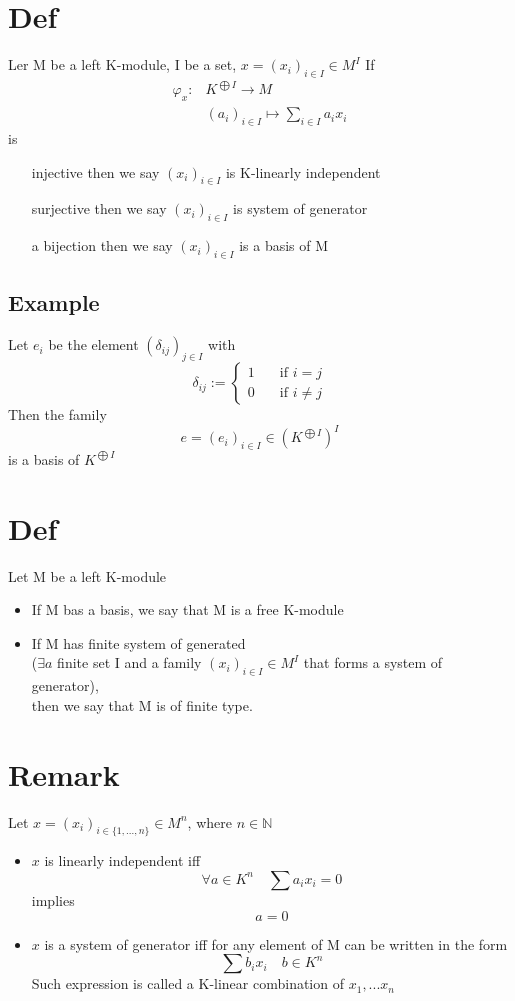 \documentclass{book}
\begin{document}
\section{Def}
Ler M be a left K-module, I be a set, $x=(x_i)_{i\in I}\in M^I$ If $$\begin{aligned}
\varphi_x:&K^{\bigoplus I}\rightarrow M\\ &(a_i)_{i\in I}\mapsto\sum\limits_{i\in I}a_ix_i
\end{aligned}$$ is
\begin{itemize}
    \item [injective] then we say $(x_i)_{i\in I}$ is K-linearly independent
    \item [surjective]then we say $(x_i)_{i\in I}$ is system of generator
    \item [a bijection]then we say $(x_i)_{i\in I}$ is a basis of M
\end{itemize}
\subsection*{Example}
Let $e_i$ be the element $(\delta_{ij})_{j\in I}$ with
$$\delta_{ij}:=\left\{\begin{aligned}
    1\quad &\text{if }i=j\\
    0\quad &\text{if }i\not=j
\end{aligned}\right.$$
Then the family $$e=(e_i)_{i\in I}\in (K^{\bigoplus I})^I$$is a basis of $K^{\bigoplus I}$
\section{Def}
Let M be a left K-module 
\begin{itemize}
    \item If M bas a basis, we say that M is a free K-module
    \item If M has finite system of generated\\($\exists a$ finite set I and a family $(x_i)_{i\in I}\in M^I$ that forms a system of generator),\\ then we say that M is of finite type.
\end{itemize}
\section{Remark}
Let $x=(x_i)_{i\in\{1,...,n\}}\in M^n$, where $n\in \mathbb{N}$
\begin{itemize}
    \item $x$ is linearly independent iff $$\forall a\in K^n\quad \sum a_ix_i=0$$implies$$a=0$$
    \item $x$ is a system of generator iff for any element of M can be written in the form $$\sum b_ix_i\quad b\in K^n$$ Such expression is called a K-linear combination of $x_1,...x_n$
\end{itemize}\
\end{document}
